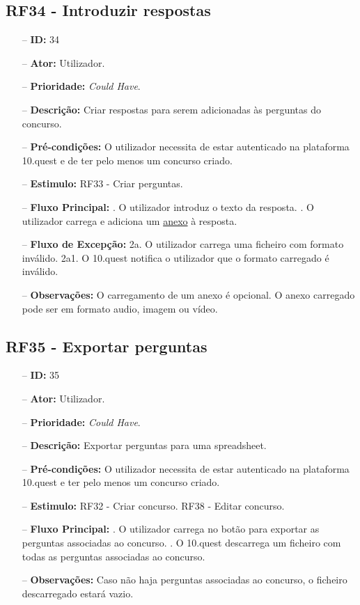 \subsection{RF34 - Introduzir respostas}
\begin{itemize}
	\item[--] \textbf{ID:} 34
	\item[--]  \textbf{Ator:} Utilizador.
	\item[--]  \textbf{Prioridade:} \textit{Could Have}.
	\item[--]  \textbf{Descrição:} Criar respostas para serem adicionadas às perguntas do concurso.
	\item[--]  \textbf{Pré-condições:} O utilizador necessita de estar autenticado na plataforma 10.quest e de ter pelo menos um concurso criado.
	\item[--]  \textbf{Estimulo:} RF33 - Criar perguntas.
	\item[--]  \textbf{Fluxo Principal:} 
	. O utilizador introduz o texto da resposta.
	. O utilizador carrega e adiciona um \underline{anexo} à resposta.
	\item[--]  \textbf{Fluxo de Excepção:} 
	\subitem 2a. O utilizador carrega uma ficheiro com formato inválido.
	\subitem 2a1. O 10.quest notifica o utilizador que o formato carregado é inválido.
	\item[--]  \textbf{Observações:} O carregamento de um anexo é opcional. O anexo carregado pode ser em formato audio, imagem ou vídeo.
\end{itemize}
\newpage

\subsection{RF35 - Exportar perguntas}
\begin{itemize}
	\item[--] \textbf{ID:} 35
	\item[--]  \textbf{Ator:} Utilizador.
	\item[--]  \textbf{Prioridade:} \textit{Could Have}.
	\item[--]  \textbf{Descrição:} Exportar perguntas para uma spreadsheet.
	\item[--]  \textbf{Pré-condições:} O utilizador necessita de estar autenticado na plataforma 10.quest e ter pelo menos um concurso criado.
	\item[--]  \textbf{Estimulo:}  
	\subitem RF32 - Criar concurso.
	\subitem RF38 - Editar concurso.
	\item[--]  \textbf{Fluxo Principal:} 
	. O utilizador carrega no botão para exportar as perguntas associadas ao concurso.
	. O 10.quest descarrega um ficheiro com todas as perguntas associadas ao concurso.
	\item[--]  \textbf{Observações:} Caso não haja perguntas associadas ao concurso, o ficheiro descarregado estará vazio.
\end{itemize}
\newpage

